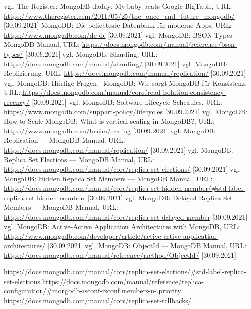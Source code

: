 \begin{thebibliography}{2}
         vgl. The Register: MongoDB daddy: My baby beats Google BigTable, URL: \url{https://www.theregister.com/2011/05/25/the_once_and_future_mongodb/} [30.09.2021]
         MongoDB: Die beliebteste Datenbank für moderne Apps, URL: \url{https://www.mongodb.com/de-de} [30.09.2021]
         vgl. MongoDB: BSON Types — MongoDB Manual, URL: \url{https://docs.mongodb.com/manual/reference/bson-types/} [30.09.2021]
         vgl. MongoDB: Sharding, URL: \url{https://docs.mongodb.com/manual/sharding/} [30.09.2021]
         vgl. MongoDB: Replizierung, URL: \url{https://docs.mongodb.com/manual/replication/} [30.09.2021]
         vgl. MongoDB: Häufige Fragen | MongoDB: Wie sorgt MongoDB für Konsistenz, URL: \url{https://docs.mongodb.com/manual/core/read-isolation-consistency-recency/} [30.09.2021]
         vgl. MongoDB: Software Lifecycle Schedules, URL: \url{https://www.mongodb.com/support-policy/lifecycles} [30.09.2021]
         vgl. MongoDB: How to Scale MongoDB: What is vertical scaling in MongoDB?, URL: \url{https://www.mongodb.com/basics/scaling} [30.09.2021]
         vgl. MongoDB: Replication — MongoDB Manual, URL: \url{https://docs.mongodb.com/manual/replication/} [30.09.2021]
         vgl. MongoDB: Replica Set Elections — MongoDB Manual, URL: \url{https://docs.mongodb.com/manual/core/replica-set-elections/} [30.09.2021]
         vgl. MongoDB: Hidden Replica Set Members — MongoDB Manual, URL: \url{https://docs.mongodb.com/manual/core/replica-set-hidden-member/#std-label-replica-set-hidden-members} [30.09.2021]
         vgl. MongoDB: Delayed Replica Set Members — MongoDB Manual, URL: \url{https://docs.mongodb.com/manual/core/replica-set-delayed-member} [30.09.2021]
         vgl. MongoDB: Active-Active Application Architectures with MongoDB, URL: \url{https://www.mongodb.com/developer/article/active-active-application-architectures/} [30.09.2021]
         vgl. MongoDB: ObjectId — MongoDB Manual, URL: \url{https://docs.mongodb.com/manual/reference/method/ObjectId/} [30.09.2021]

         \url{https://docs.mongodb.com/manual/core/replica-set-elections/#std-label-replica-set-elections}
         \url{https://docs.mongodb.com/manual/reference/replica-configuration/#mongodb-rsconf-rsconf.members-n-.priority}
         \url{https://docs.mongodb.com/manual/core/replica-set-rollbacks/}




\end{thebibliography}
